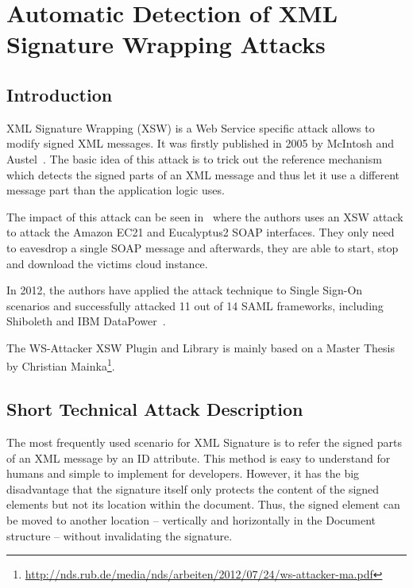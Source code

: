 \section{Automatic Detection of XML Signature Wrapping Attacks}
\label{sec:automatic_detection_of_xml_signature_wrapping_attacks}

\subsection{Introduction}
\label{sec:introduction}

XML Signature Wrapping (XSW) is a Web Service specific attack allows to modify signed
XML messages. 
It was firstly published in 2005 by McIntosh and Austel~\cite{xsw}. 
The basic idea of this attack is to trick out the reference mechanism which detects the signed parts
of an XML message and thus let it use a different message part than the application
logic uses.

The impact of this attack can be seen in~\cite{amazon} where the authors uses an XSW attack to
attack the Amazon EC21 and Eucalyptus2 SOAP interfaces. They only need to eavesdrop
a single SOAP message and afterwards, they are able to start, stop and download the
victims cloud instance.

In 2012, the authors have applied the attack technique to Single Sign-On scenarios and successfully attacked 11 out of 14 SAML frameworks, including Shiboleth and IBM DataPower~\cite{samlattacking}.

The WS-Attacker XSW Plugin and Library is mainly based on a Master Thesis by Christian Mainka\footnote{\url{http://nds.rub.de/media/nds/arbeiten/2012/07/24/ws-attacker-ma.pdf}}.

\subsection{Short Technical Attack Description}
\label{sec:short_technical_attack_description}

The most frequently used scenario for XML Signature is to refer the signed parts of an XML message by an ID attribute. 
This method is easy to understand for humans and simple to implement for developers. 
However, it has the big disadvantage that the signature itself only protects the content of the signed elements but not its location within the document. 
Thus, the signed element can be moved to another location -- vertically and horizontally in the Document structure -- without invalidating the signature. 

